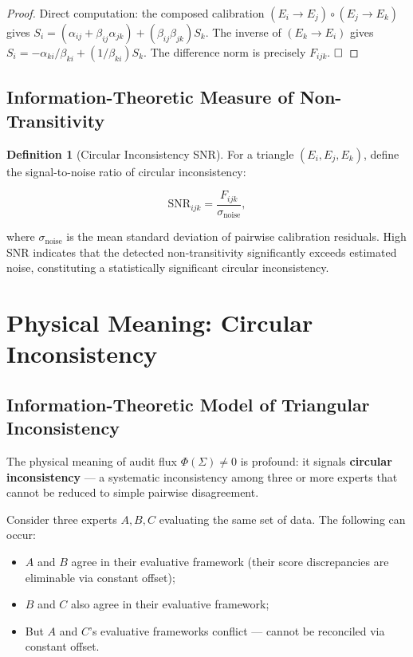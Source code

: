 \documentclass[12pt,a4paper]{article}
\theoremstyle{plain}
\theoremstyle{definition}
\newtheorem{definition}[theorem]{Definition}
\theoremstyle{remark}
\begin{document}
\begin{proof}
Direct computation: the composed calibration $(E_i \to E_j) \circ (E_j \to E_k)$ gives $S_i = (\alpha_{ij} + \beta_{ij}\alpha_{jk}) + (\beta_{ij}\beta_{jk}) S_k$. The inverse of $(E_k \to E_i)$ gives $S_i = -\alpha_{ki}/\beta_{ki} + (1/\beta_{ki}) S_k$. The difference norm is precisely $F_{ijk}$. $\hfill\square$
\end{proof}

\subsection{Information-Theoretic Measure of Non-Transitivity}
\label{sec:info_measure}

\begin{definition}[Circular Inconsistency SNR]
\label{def:circ_snr}
For a triangle $(E_i, E_j, E_k)$, define the signal-to-noise ratio of circular inconsistency:

\begin{equation}\label{eq:circ_snr_def}
    \mathrm{SNR}_{ijk} = \frac{F_{ijk}}{\sigma_{\mathrm{noise}}},
\end{equation}

where $\sigma_{\mathrm{noise}}$ is the mean standard deviation of pairwise calibration residuals. High SNR indicates that the detected non-transitivity significantly exceeds estimated noise, constituting a statistically significant circular inconsistency.
\end{definition}

\section{Physical Meaning: Circular Inconsistency}
\label{sec:physical}

\subsection{Information-Theoretic Model of Triangular Inconsistency}
\label{sec:triangular}

The physical meaning of audit flux $\Phi(\Sigma) \neq 0$ is profound: it signals \textbf{circular inconsistency} --- a systematic inconsistency among three or more experts that cannot be reduced to simple pairwise disagreement.

Consider three experts $A, B, C$ evaluating the same set of data. The following can occur:
\begin{itemize}
    \item $A$ and $B$ agree in their evaluative framework (their score discrepancies are eliminable via constant offset);
    \item $B$ and $C$ also agree in their evaluative framework;
    \item But $A$ and $C$'s evaluative frameworks conflict --- cannot be reconciled via constant offset.
\end{itemize}
\end{document}
